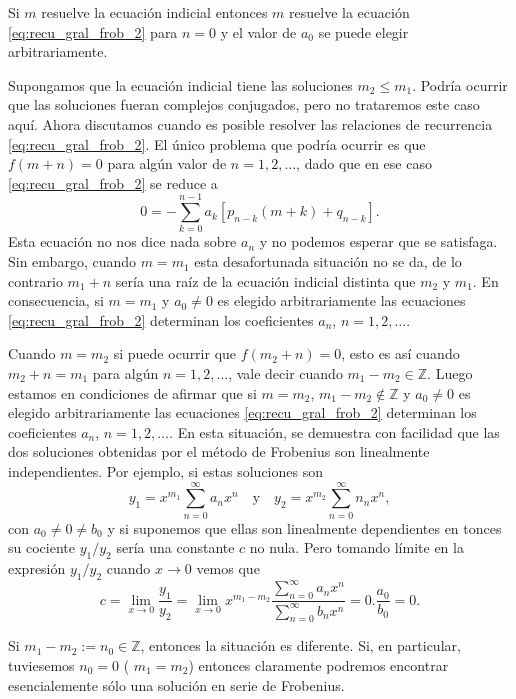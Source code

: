 \documentclass{article}
\newcounter{lem_cont}
\newcounter{ejem_cont}
\renewcommand{\emph}[1]{\textcolor[rgb]{0,0,1}{#1}}
\begin{document}
Si $m$ resuelve la ecuación indicial entonces $m$ resuelve la ecuación \eqref{eq:recu_gral_frob_2} para $n=0$ y el valor de $a_0$ se puede elegir arbitrariamente. 

Supongamos que la ecuación indicial tiene las soluciones $m_2\leq m_1$. Podría ocurrir que las soluciones fueran complejos conjugados, pero no trataremos este caso aquí. Ahora discutamos  cuando es posible resolver las relaciones de recurrencia \eqref{eq:recu_gral_frob_2}. El único problema que podría ocurrir es que  $f(m+n)=0$ para algún valor de $n=1,2,\ldots$, dado que en ese caso \eqref{eq:recu_gral_frob_2} se reduce a 
\begin{equation}\label{eq:ec_enter} 0=-\sum_{k=0}^{n-1}a_k\left[p_{n-k}(m+k) +
q_{n-k}\right].
\end{equation}
Esta ecuación no nos dice nada sobre $a_n$ y no podemos esperar que se satisfaga. Sin embargo, cuando $m=m_1$ esta desafortunada situación no se da, de lo contrario  $m_1+n$ sería una raíz de la ecuación indicial distinta que $m_2$ y $m_1$. En consecuencia, \emph{si $m=m_1$ y $a_0\neq 0$ es elegido arbitrariamente las ecuaciones \eqref{eq:recu_gral_frob_2} determinan los coeficientes $a_n$, $n=1,2,\ldots$.}

Cuando $m=m_2$ si puede ocurrir que $f(m_2+n)=0$, esto es así cuando $m_2+n=m_1$ para algún $n=1,2,\ldots$, vale decir cuando $m_1-m_2\in\mathbb{Z}$.  Luego estamos en condiciones de afirmar que \emph{si $m=m_2$, $m_1-m_2\notin \mathbb{Z}$ y $a_0\neq 0$ es elegido arbitrariamente las ecuaciones \eqref{eq:recu_gral_frob_2} determinan los coeficientes $a_n$, $n=1,2,\ldots$.} En esta situación, se demuestra con facilidad que las dos soluciones obtenidas por el método de Frobenius son linealmente independientes. Por ejemplo, si estas soluciones son
\[y_1=x^{m_1}\sum_{n=0}^{\infty}a_nx^n\quad\text{y}\quad y_2=x^{m_2}\sum_{n=0}^{\infty}n_nx^n,\]
con $a_0\neq 0\neq b_0$ y si suponemos que ellas son linealmente dependientes en tonces su cociente $y_1/y_2$ sería una constante $c$  no nula. Pero tomando límite en la expresión $y_1/y_2$ cuando $x\to 0$ vemos que
\[c=\lim_{x\to 0} \frac{y_1}{y_2}=\lim_{x\to 0} x^{m_1-m_2}\frac{\sum_{n=0}^{\infty}a_nx^n}{ \sum_{n=0}^{\infty}b_nx^n  }=0.\frac{a_0}{b_0}=0.\]

Si $m_1-m_2:=n_0\in\mathbb{Z}$, entonces la situación es diferente. Si, en particular,  \emph{tuviesemos $n_0=0$ ( $m_1=m_2$) entonces claramente podremos encontrar esencialemente sólo una solución en serie de Frobenius.}   
\end{document}

